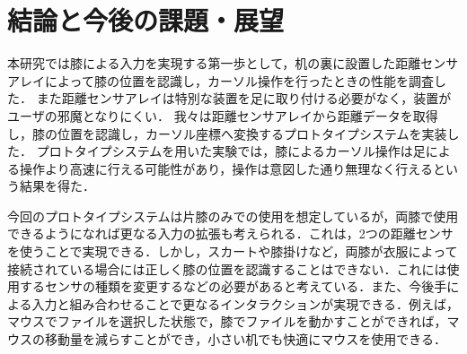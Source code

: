 \documentclass[submit, techrep]{ipsj}
\begin{document}
\section{結論と今後の課題・展望}
本研究では膝による入力を実現する第一歩として，机の裏に設置した距離センサアレイによって膝の位置を認識し，カーソル操作を行ったときの性能を調査した．
また距離センサアレイは特別な装置を足に取り付ける必要がなく，装置がユーザの邪魔となりにくい．
我々は距離センサアレイから距離データを取得し，膝の位置を認識し，カーソル座標へ変換するプロトタイプシステムを実装した．
プロトタイプシステムを用いた実験では，膝によるカーソル操作は足による操作より高速に行える可能性があり，操作は意図した通り無理なく行えるという結果を得た．\par
今回のプロトタイプシステムは片膝のみでの使用を想定しているが，両膝で使用できるようになれば更なる入力の拡張も考えられる．これは，2つの距離センサを使うことで実現できる．しかし，スカートや膝掛けなど，両膝が衣服によって接続されている場合には正しく膝の位置を認識することはできない．これには使用するセンサの種類を変更するなどの必要があると考えている．また、今後手による入力と組み合わせることで更なるインタラクションが実現できる．例えば，マウスでファイルを選択した状態で，膝でファイルを動かすことができれば，マウスの移動量を減らすことができ，小さい机でも快適にマウスを使用できる．


%
%
%




\begin{biography}
%
%
\end{biography}
\end{document}

